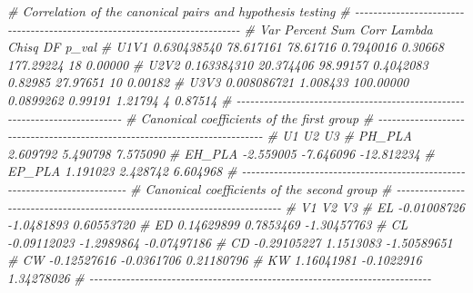 \documentclass[
]{book}
\newenvironment{Shaded}{\begin{snugshade}}{\end{snugshade}}
\newcommand{\CommentTok}[1]{\textcolor[rgb]{0.56,0.35,0.01}{\textit{#1}}}
\numberwithin{equation}{section}
\begin{document}
\begin{Shaded}
\begin{Highlighting}[]
\CommentTok{\# Correlation of the canonical pairs and hypothesis testing }
\CommentTok{\# {-}{-}{-}{-}{-}{-}{-}{-}{-}{-}{-}{-}{-}{-}{-}{-}{-}{-}{-}{-}{-}{-}{-}{-}{-}{-}{-}{-}{-}{-}{-}{-}{-}{-}{-}{-}{-}{-}{-}{-}{-}{-}{-}{-}{-}{-}{-}{-}{-}{-}{-}{-}{-}{-}{-}{-}{-}{-}{-}{-}{-}{-}{-}{-}{-}{-}{-}{-}{-}{-}{-}{-}{-}{-}{-}}
\CommentTok{\#              Var   Percent       Sum      Corr  Lambda     Chisq DF   p\_val}
\CommentTok{\# U1V1 0.630438540 78.617161  78.61716 0.7940016 0.30668 177.29224 18 0.00000}
\CommentTok{\# U2V2 0.163384310 20.374406  98.99157 0.4042083 0.82985  27.97651 10 0.00182}
\CommentTok{\# U3V3 0.008086721  1.008433 100.00000 0.0899262 0.99191   1.21794  4 0.87514}
\CommentTok{\# {-}{-}{-}{-}{-}{-}{-}{-}{-}{-}{-}{-}{-}{-}{-}{-}{-}{-}{-}{-}{-}{-}{-}{-}{-}{-}{-}{-}{-}{-}{-}{-}{-}{-}{-}{-}{-}{-}{-}{-}{-}{-}{-}{-}{-}{-}{-}{-}{-}{-}{-}{-}{-}{-}{-}{-}{-}{-}{-}{-}{-}{-}{-}{-}{-}{-}{-}{-}{-}{-}{-}{-}{-}{-}{-}}
\CommentTok{\# Canonical coefficients of the first group }
\CommentTok{\# {-}{-}{-}{-}{-}{-}{-}{-}{-}{-}{-}{-}{-}{-}{-}{-}{-}{-}{-}{-}{-}{-}{-}{-}{-}{-}{-}{-}{-}{-}{-}{-}{-}{-}{-}{-}{-}{-}{-}{-}{-}{-}{-}{-}{-}{-}{-}{-}{-}{-}{-}{-}{-}{-}{-}{-}{-}{-}{-}{-}{-}{-}{-}{-}{-}{-}{-}{-}{-}{-}{-}{-}{-}{-}{-}}
\CommentTok{\#               U1        U2         U3}
\CommentTok{\# PH\_PLA  2.609792  5.490798   7.575090}
\CommentTok{\# EH\_PLA {-}2.559005 {-}7.646096 {-}12.812234}
\CommentTok{\# EP\_PLA  1.191023  2.428742   6.604968}
\CommentTok{\# {-}{-}{-}{-}{-}{-}{-}{-}{-}{-}{-}{-}{-}{-}{-}{-}{-}{-}{-}{-}{-}{-}{-}{-}{-}{-}{-}{-}{-}{-}{-}{-}{-}{-}{-}{-}{-}{-}{-}{-}{-}{-}{-}{-}{-}{-}{-}{-}{-}{-}{-}{-}{-}{-}{-}{-}{-}{-}{-}{-}{-}{-}{-}{-}{-}{-}{-}{-}{-}{-}{-}{-}{-}{-}{-}}
\CommentTok{\# Canonical coefficients of the second group }
\CommentTok{\# {-}{-}{-}{-}{-}{-}{-}{-}{-}{-}{-}{-}{-}{-}{-}{-}{-}{-}{-}{-}{-}{-}{-}{-}{-}{-}{-}{-}{-}{-}{-}{-}{-}{-}{-}{-}{-}{-}{-}{-}{-}{-}{-}{-}{-}{-}{-}{-}{-}{-}{-}{-}{-}{-}{-}{-}{-}{-}{-}{-}{-}{-}{-}{-}{-}{-}{-}{-}{-}{-}{-}{-}{-}{-}{-}}
\CommentTok{\#             V1         V2          V3}
\CommentTok{\# EL {-}0.01008726 {-}1.0481893  0.60553720}
\CommentTok{\# ED  0.14629899  0.7853469 {-}1.30457763}
\CommentTok{\# CL {-}0.09112023 {-}1.2989864 {-}0.07497186}
\CommentTok{\# CD {-}0.29105227  1.1513083 {-}1.50589651}
\CommentTok{\# CW {-}0.12527616 {-}0.0361706  0.21180796}
\CommentTok{\# KW  1.16041981 {-}0.1022916  1.34278026}
\CommentTok{\# {-}{-}{-}{-}{-}{-}{-}{-}{-}{-}{-}{-}{-}{-}{-}{-}{-}{-}{-}{-}{-}{-}{-}{-}{-}{-}{-}{-}{-}{-}{-}{-}{-}{-}{-}{-}{-}{-}{-}{-}{-}{-}{-}{-}{-}{-}{-}{-}{-}{-}{-}{-}{-}{-}{-}{-}{-}{-}{-}{-}{-}{-}{-}{-}{-}{-}{-}{-}{-}{-}{-}{-}{-}{-}{-}}

\end{Highlighting}
\end{Shaded}
\end{document}
